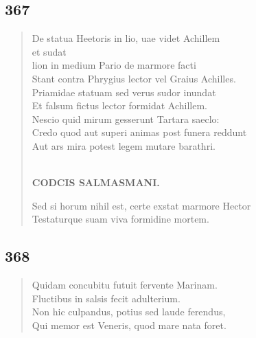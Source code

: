 \documentclass[11pt, a4paper]{report}
\begin{document}
            \subsection*{367}
      \begin{verse}
      De statua Heetoris in lio, uae videt Achillem \\ et sudat \\ lion in medium Pario de marmore facti \\ Stant contra Phrygius lector vel Graius Achilles. \\ Priamidae statuam sed verus sudor inundat \\ Et falsum fictus lector formidat Achillem. \\ Nescio quid mirum gesserunt Tartara saeclo: \\ Credo quod aut superi animas post funera reddunt \\ Aut ars mira potest legem mutare barathri. \\ 
        ﻿\pagebreak 
    \begin{center} \textbf{CODCIS SALMASMANI.} \end{center} \marginpar{[285]} Sed si horum nihil est, certe exstat marmore Hector \\ Testaturque suam viva formidine mortem. \\ 
      \end{verse}
  
            \subsection*{368}
      \begin{verse}
      Quidam concubitu futuit fervente Marinam. \\ Fluctibus in salsis fecit adulterium. \\ Non hic culpandus, potius sed laude ferendus, \\ Qui memor est Veneris, quod mare nata foret. \\ 
      \end{verse}
  
\end{document}
